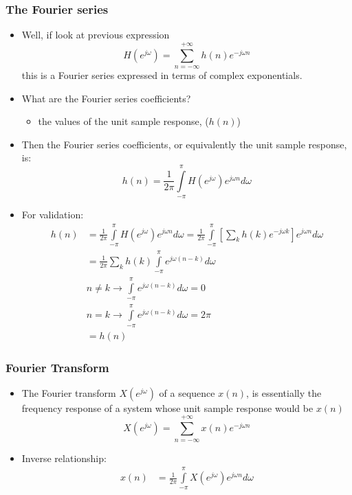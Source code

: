 \documentclass[pdflatex,compress,mathserif]{beamer}
\begin{document}
\begin{frame}
	\frametitle{The Fourier series}
	\begin{itemize}
		\item Well, if look at previous expression
		\[ H(e^{j\omega}) = \sum\limits_{n = -\infty}^{+\infty} h(n) e^{-j \omega n} \]
		this is a Fourier series expressed in terms of complex exponentials.
		\item What are the Fourier series coefficients?
		\begin{itemize}
			\item the values of the unit sample response, ($ h(n) $)
		\end{itemize}
		\item Then the Fourier series coefficients, or equivalently the unit sample response, is:
			\[ h(n) = \frac{1}{2\pi}\int\limits_{-\pi}^{\pi} H(e^{j\omega})e^{j\omega n} d\omega\]
	\end{itemize}
\end{frame}

\begin{frame}
	\begin{itemize}
		\item For validation:
		\begin{align*}
			h(n) &= \frac{1}{2\pi}\int\limits_{-\pi}^{\pi} H(e^{j\omega})e^{j\omega n} d\omega = \frac{1}{2\pi}\int\limits_{-\pi}^{\pi} \left[ \sum\limits_{k} h(k) e^{-j \omega k} \right]e^{j\omega n} d\omega \\
			&= \frac{1}{2\pi} \sum\limits_{k} h(k) \int\limits_{-\pi}^{\pi} e^{j\omega (n-k)} d\omega \\
			& n \neq k \rightarrow \int\limits_{-\pi}^{\pi} e^{j\omega (n-k)} d\omega = 0\\
			& n = k \rightarrow \int\limits_{-\pi}^{\pi} e^{j\omega (n-k)} d\omega = 2 \pi \\
			&= h(n)
		\end{align*}
	\end{itemize}
\end{frame}

\begin{frame}
	\frametitle{Fourier Transform}
	\begin{itemize}
		\item The Fourier transform $ X(e^{j \omega}) $ of a sequence $ x(n) $, is essentially the frequency response of a system whose unit sample response would be $ x(n) $
		\[ X(e^{j \omega}) = \sum_{n = - \infty}^{+\infty} x(n) e^{-j \omega n} \]
		\item Inverse relationship:
		\begin{align*}
			x(n) &= \frac{1}{2\pi}\int\limits_{-\pi}^{\pi}X(e^{j \omega}) e^{j \omega n} d\omega \\
		\end{align*}
	\end{itemize}
\end{frame}
\end{document}
